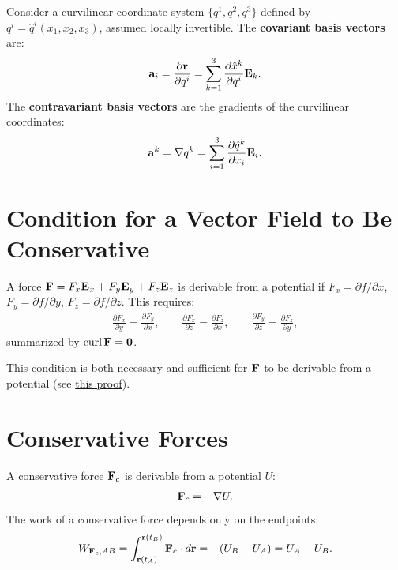 \documentclass[
  letterpaper,
  DIV=11,
  numbers=noendperiod]{scrreprt}
\begin{document}
Consider a curvilinear coordinate system \(\{q^1,q^2,q^3\}\) defined by
\(q^i = \hat{q}^i(x_1,x_2,x_3)\), assumed locally invertible. The
\textbf{covariant basis vectors} are: \begin{align}
    {\bf a}_i = \frac{\partial{\bf r}}{\partial q^i} = \sum_{k=1}^3\frac{\partial\hat{x}^k}{\partial q^i}{\bf E}_k.
\end{align} The \textbf{contravariant basis vectors} are the gradients
of the curvilinear coordinates: \begin{align}
    {\bf a}^k = \nabla q^k = \sum_{i=1}^3\frac{\partial\hat{q}^k}{\partial x_i}{\bf E}_i.
\end{align}

\section{Condition for a Vector Field to Be
Conservative}\label{condition-for-a-vector-field-to-be-conservative}

A force \({\bf F} = F_x{\bf E}_x+F_y{\bf E}_y+F_z{\bf E}_z\) is
derivable from a potential if \(F_x = \partial f/\partial x\),
\(F_y = \partial f/\partial y\), \(F_z = \partial f/\partial z\). This
requires: \begin{align}
    \frac{\partial F_x}{\partial y} = \frac{\partial F_y}{\partial x}, \qquad
    \frac{\partial F_x}{\partial z} = \frac{\partial F_z}{\partial x}, \qquad
    \frac{\partial F_y}{\partial z} = \frac{\partial F_z}{\partial y},
\end{align} summarized by \(\text{curl}\,{\bf F} = {\bf 0}\).

This condition is both necessary and sufficient for \({\bf F}\) to be
derivable from a potential (see
\href{https://chatgpt.com/share/68da8fea-c574-8011-afa4-15974e1bd223}{this
proof}).

\section{Conservative Forces}\label{conservative-forces-1}

A conservative force \({\bf F}_c\) is derivable from a potential \(U\):
\begin{align}
    {\bf F}_c = -\nabla U.
\end{align} The work of a conservative force depends only on the
endpoints: \begin{align}
    W_{{\bf F}_c,AB} = \int_{{\bf r}(t_A)}^{{\bf r}(t_B)}{\bf F}_c\cdot d{\bf r} = -(U_B-U_A) = U_A-U_B.
\end{align}
\end{document}
